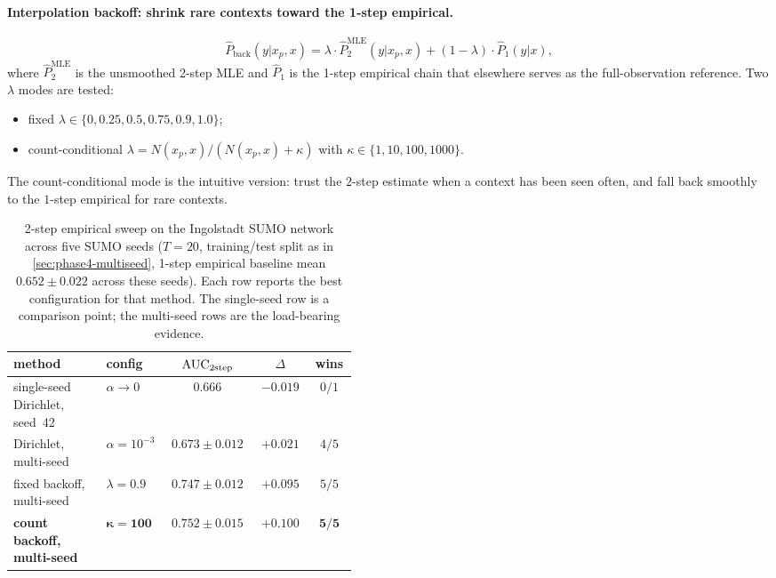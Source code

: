 \paragraph{Interpolation backoff: shrink rare contexts toward the 1-step empirical.}
\[
\widehat{P}_{\mathrm{back}}(y | x_p, x) =
\lambda \cdot \widehat{P}_{2}^{\mathrm{MLE}}(y | x_p, x)
+ (1 - \lambda) \cdot \widehat{P}_{1}(y | x),
\]
where $\widehat{P}_{2}^{\mathrm{MLE}}$ is the unsmoothed 2-step MLE
and $\widehat{P}_{1}$ is the 1-step empirical chain that elsewhere
serves as the full-observation reference. Two $\lambda$ modes are tested:
\begin{itemize}
\item fixed $\lambda \in \{0, 0.25, 0.5, 0.75, 0.9, 1.0\}$;
\item count-conditional
$\lambda = N(x_p, x) / (N(x_p, x) + \kappa)$ with
$\kappa \in \{1, 10, 100, 1000\}$.
\end{itemize}
The count-conditional mode is the intuitive version: trust the $2$-step
estimate when a context has been seen often, and fall back smoothly to the
$1$-step empirical for rare contexts.

\begin{table}[H]
\centering
\caption{2-step empirical sweep on the Ingolstadt SUMO network across five SUMO seeds
($T=20$, training/test split as in \cref{sec:phase4-multiseed}, 1-step
empirical baseline mean $0.652 \pm 0.022$ across these seeds).
Each row reports the best configuration for that method. The single-seed
row is a comparison point; the multi-seed rows are the load-bearing
evidence.}
\label{tab:phase4-2step}
\scriptsize
\begin{tabular}{@{}p{0.27\linewidth}p{0.18\linewidth}ccc@{}}
\toprule
method & config & $\mathrm{AUC}_{\mathrm{2step}}$ & $\Delta$ & wins \\
\midrule
single-seed Dirichlet, seed~42 & $\alpha \to 0$ & $0.666$ & $-0.019$ & $0/1$ \\
\midrule
Dirichlet, multi-seed            & $\alpha = 10^{-3}$ & $0.673 \pm 0.012$ & $+0.021$ & $4/5$ \\
fixed backoff, multi-seed        & $\lambda = 0.9$    & $0.747 \pm 0.012$ & $+0.095$ & $5/5$ \\
\textbf{count backoff, multi-seed} & $\boldsymbol{\kappa = 100}$ & $\boldsymbol{0.752 \pm 0.015}$ & $\boldsymbol{+0.100}$ & $\boldsymbol{5/5}$ \\
\bottomrule
\end{tabular}
\end{table}

